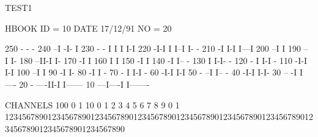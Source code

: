 \begin{Listing}
 TEST1                                                                           
 
 HBOOK     ID =        10                                        DATE  17/12/91              NO =  20
 
      250                                                        -   -  -
      240                                                      --I  -I- I
      230                                                  - - I I  I I-I
      220                                                 -I-I I I--I   I-   -
      210                                                -I  I-I         I---I
      200                                              --I                   I
      190                                           -- I                     I-
      180                                         --II-I                      I-
      170                                        -I                            I
      160                                        I                             I
      150                                       -I                             I
      140                                      -I                              I-- -
      130                                      I                                 I-I- -
      120                                    - I                                    I-I -
      110                                   -I-I                                      I-I
      100                                 --I                                           I
       90                                -I                                             I-
       80                               -I                                               I -
       70                             - I                                                I-I -
       60                            -I-I                                                  I-I
       50                        - --I                                                       I-- -
       40                       -I-I                                                           I-I-
       30                   -- -I                                                                 I----
       20          -    ----II-I                                                                      I------
       10       ---I----I                                                                                   I-------
 
 CHANNELS 100   0                                                                                                  1   
           10   0        1         2         3         4         5         6         7         8         9         0   
            1   1234567890123456789012345678901234567890123456789012345678901234567890123456789012345678901234567890   
 

\end{Listing}
